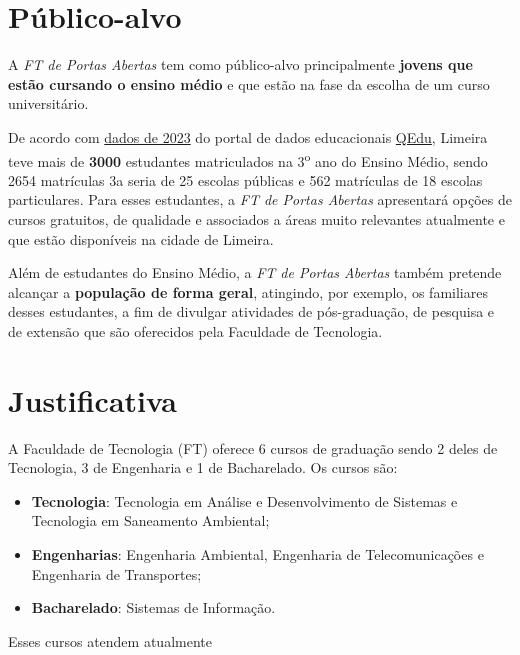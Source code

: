 \documentclass[
  letterpaper,
  DIV=11,
  numbers=noendperiod,
  oneside]{scrreprt}
\begin{document}

\chapter{Público-alvo}\label{puxfablico-alvo}

A \emph{FT de Portas Abertas} tem como público-alvo principalmente
\textbf{jovens que estão cursando o ensino médio} e que estão na fase da
escolha de um curso universitário.

De acordo com
\href{https://qedu.org.br/municipio/3526902-limeira/censo-escolar}{dados
de 2023} do portal de dados educacionais
\href{https://qedu.org.br/}{QEdu}, Limeira teve mais de \textbf{3000}
estudantes matriculados na 3\textsuperscript{o} ano do Ensino Médio,
sendo 2654 matrículas 3a seria de 25 escolas públicas e 562 matrículas
de 18 escolas particulares. Para esses estudantes, a \emph{FT de Portas
Abertas} apresentará opções de cursos gratuitos, de qualidade e
associados a áreas muito relevantes atualmente e que estão disponíveis
na cidade de Limeira.

Além de estudantes do Ensino Médio, a \emph{FT de Portas Abertas} também
pretende alcançar a \textbf{população de forma geral}, atingindo, por
exemplo, os familiares desses estudantes, a fim de divulgar atividades
de pós-graduação, de pesquisa e de extensão que são oferecidos pela
Faculdade de Tecnologia.


\chapter{Justificativa}\label{justificativa}

A Faculdade de Tecnologia (FT) oferece 6 cursos de graduação sendo 2
deles de Tecnologia, 3 de Engenharia e 1 de Bacharelado. Os cursos são:

\begin{itemize}
\item
  \textbf{Tecnologia}: Tecnologia em Análise e Desenvolvimento de
  Sistemas e Tecnologia em Saneamento Ambiental;
\item
  \textbf{Engenharias}: Engenharia Ambiental, Engenharia de
  Telecomunicações e Engenharia de Transportes;
\item
  \textbf{Bacharelado}: Sistemas de Informação.
\end{itemize}

Esses cursos atendem atualmente
\end{document}
